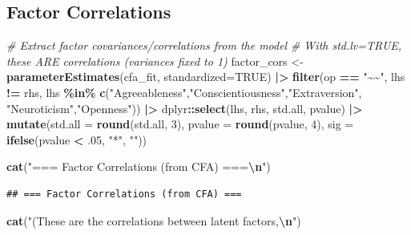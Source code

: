 \documentclass[
]{article}
\newenvironment{Shaded}{\begin{snugshade}}{\end{snugshade}}
\newcommand{\AttributeTok}[1]{\textcolor[rgb]{0.13,0.29,0.53}{#1}}
\newcommand{\CommentTok}[1]{\textcolor[rgb]{0.56,0.35,0.01}{\textit{#1}}}
\newcommand{\ConstantTok}[1]{\textcolor[rgb]{0.56,0.35,0.01}{#1}}
\newcommand{\DecValTok}[1]{\textcolor[rgb]{0.00,0.00,0.81}{#1}}
\newcommand{\FunctionTok}[1]{\textcolor[rgb]{0.13,0.29,0.53}{\textbf{#1}}}
\newcommand{\NormalTok}[1]{#1}
\newcommand{\OtherTok}[1]{\textcolor[rgb]{0.56,0.35,0.01}{#1}}
\newcommand{\SpecialCharTok}[1]{\textcolor[rgb]{0.81,0.36,0.00}{\textbf{#1}}}
\newcommand{\StringTok}[1]{\textcolor[rgb]{0.31,0.60,0.02}{#1}}
\begin{document}
\subsection{Factor Correlations}\label{factor-correlations}

\begin{Shaded}
\begin{Highlighting}[]
\CommentTok{\# Extract factor covariances/correlations from the model}
\CommentTok{\# With std.lv=TRUE, these ARE correlations (variances fixed to 1)}
\NormalTok{factor\_cors }\OtherTok{\textless{}{-}} \FunctionTok{parameterEstimates}\NormalTok{(cfa\_fit, }\AttributeTok{standardized=}\ConstantTok{TRUE}\NormalTok{) }\SpecialCharTok{|\textgreater{}}
  \FunctionTok{filter}\NormalTok{(op }\SpecialCharTok{==} \StringTok{"\textasciitilde{}\textasciitilde{}"}\NormalTok{,}
\NormalTok{         lhs }\SpecialCharTok{!=}\NormalTok{ rhs,}
\NormalTok{         lhs }\SpecialCharTok{\%in\%} \FunctionTok{c}\NormalTok{(}\StringTok{"Agreeableness"}\NormalTok{,}\StringTok{"Conscientiousness"}\NormalTok{,}\StringTok{"Extraversion"}\NormalTok{,}
                     \StringTok{"Neuroticism"}\NormalTok{,}\StringTok{"Openness"}\NormalTok{)) }\SpecialCharTok{|\textgreater{}}
\NormalTok{  dplyr}\SpecialCharTok{::}\FunctionTok{select}\NormalTok{(lhs, rhs, std.all, pvalue) }\SpecialCharTok{|\textgreater{}}
  \FunctionTok{mutate}\NormalTok{(}\AttributeTok{std.all =} \FunctionTok{round}\NormalTok{(std.all, }\DecValTok{3}\NormalTok{),}
         \AttributeTok{pvalue  =} \FunctionTok{round}\NormalTok{(pvalue, }\DecValTok{4}\NormalTok{),}
         \AttributeTok{sig     =} \FunctionTok{ifelse}\NormalTok{(pvalue }\SpecialCharTok{\textless{}}\NormalTok{ .}\DecValTok{05}\NormalTok{, }\StringTok{"*"}\NormalTok{, }\StringTok{""}\NormalTok{))}

\FunctionTok{cat}\NormalTok{(}\StringTok{"=== Factor Correlations (from CFA) ===}\SpecialCharTok{\textbackslash{}n}\StringTok{"}\NormalTok{)}
\end{Highlighting}
\end{Shaded}

\begin{verbatim}
## === Factor Correlations (from CFA) ===
\end{verbatim}

\begin{Shaded}
\begin{Highlighting}[]
\FunctionTok{cat}\NormalTok{(}\StringTok{"(These are the correlations between latent factors,}\SpecialCharTok{\textbackslash{}n}\StringTok{"}\NormalTok{)}
\end{Highlighting}
\end{Shaded}
\end{document}
